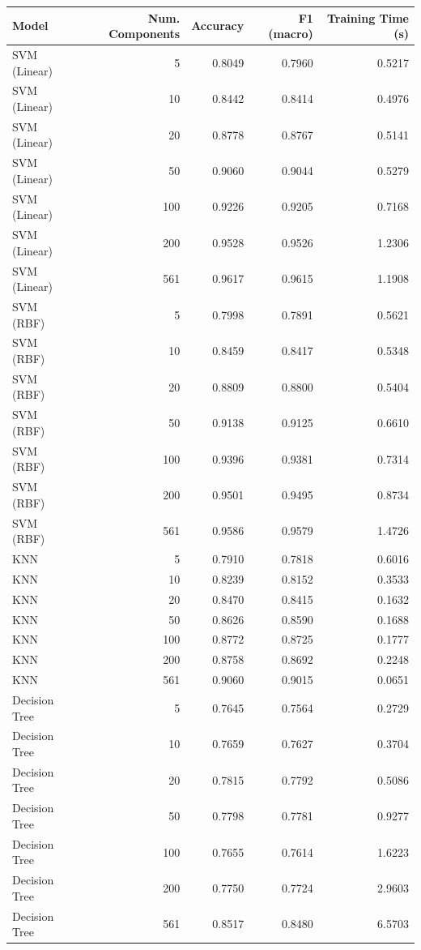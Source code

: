 \begin{tabular}{lrrrr}
\toprule
Model & Num. Components & Accuracy & F1 (macro) & Training Time (s) \\
\midrule
SVM (Linear) & 5 & 0.8049 & 0.7960 & 0.5217 \\
SVM (Linear) & 10 & 0.8442 & 0.8414 & 0.4976 \\
SVM (Linear) & 20 & 0.8778 & 0.8767 & 0.5141 \\
SVM (Linear) & 50 & 0.9060 & 0.9044 & 0.5279 \\
SVM (Linear) & 100 & 0.9226 & 0.9205 & 0.7168 \\
SVM (Linear) & 200 & 0.9528 & 0.9526 & 1.2306 \\
SVM (Linear) & 561 & 0.9617 & 0.9615 & 1.1908 \\
SVM (RBF) & 5 & 0.7998 & 0.7891 & 0.5621 \\
SVM (RBF) & 10 & 0.8459 & 0.8417 & 0.5348 \\
SVM (RBF) & 20 & 0.8809 & 0.8800 & 0.5404 \\
SVM (RBF) & 50 & 0.9138 & 0.9125 & 0.6610 \\
SVM (RBF) & 100 & 0.9396 & 0.9381 & 0.7314 \\
SVM (RBF) & 200 & 0.9501 & 0.9495 & 0.8734 \\
SVM (RBF) & 561 & 0.9586 & 0.9579 & 1.4726 \\
KNN & 5 & 0.7910 & 0.7818 & 0.6016 \\
KNN & 10 & 0.8239 & 0.8152 & 0.3533 \\
KNN & 20 & 0.8470 & 0.8415 & 0.1632 \\
KNN & 50 & 0.8626 & 0.8590 & 0.1688 \\
KNN & 100 & 0.8772 & 0.8725 & 0.1777 \\
KNN & 200 & 0.8758 & 0.8692 & 0.2248 \\
KNN & 561 & 0.9060 & 0.9015 & 0.0651 \\
Decision Tree & 5 & 0.7645 & 0.7564 & 0.2729 \\
Decision Tree & 10 & 0.7659 & 0.7627 & 0.3704 \\
Decision Tree & 20 & 0.7815 & 0.7792 & 0.5086 \\
Decision Tree & 50 & 0.7798 & 0.7781 & 0.9277 \\
Decision Tree & 100 & 0.7655 & 0.7614 & 1.6223 \\
Decision Tree & 200 & 0.7750 & 0.7724 & 2.9603 \\
Decision Tree & 561 & 0.8517 & 0.8480 & 6.5703 \\
\bottomrule
\end{tabular}
